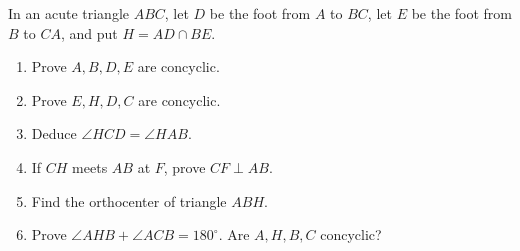 In an acute triangle $ABC$, let $D$ be the foot from $A$ to $BC$, let $E$ be the foot from $B$ to $CA$, and put $H=AD\cap BE$.
\begin{enumerate}
\item Prove $A,B,D,E$ are concyclic.
\item Prove $E,H,D,C$ are concyclic.
\item Deduce $\angle HCD=\angle HAB$.
\item If $CH$ meets $AB$ at $F$, prove $CF\perp AB$.
\item Find the orthocenter of triangle $ABH$.
\item Prove $\angle AHB+\angle ACB=180^\circ$. Are $A,H,B,C$ concyclic?
\end{enumerate}
